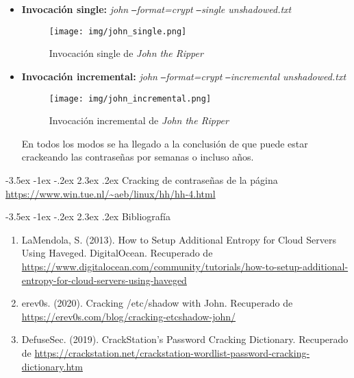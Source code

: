 \documentclass[11pt]{report}
\makeatletter
\renewcommand\chapter{\@startsection{chapter}{0}{\z@}%
    {-3.5ex \@plus -1ex \@minus -.2ex}%
    {2.3ex \@plus.2ex}%
    {\normalfont\Large\bfseries}}
\makeatother
\begin{document}
\begin{itemize}
  \item \textbf{Invocación single:} \emph{john \texttt{--}format=crypt \texttt{--}single unshadowed.txt}
  \begin{figure}[H]
    \centering
    \texttt{[image: img/john\_single.png]}
    \caption{Invocación single de \emph{John the Ripper}}
    \label{fig:invocación single de john the ripper}
  \end{figure}

  \item \textbf{Invocación incremental:} \emph{john \texttt{--}format=crypt \texttt{--}incremental unshadowed.txt}
  \begin{figure}[H]
    \centering
    \texttt{[image: img/john\_incremental.png]}
    \caption{Invocación incremental de \emph{John the Ripper}}
    \label{fig:invocación incremental de john the ripper}
  \end{figure}
  
  En todos los modos se ha llegado a la conclusión de que puede estar crackeando las contraseñas por semanas o incluso años.
\end{itemize}

\cleardoublepage
\chapter{Cracking de contraseñas de la página \url{https://www.win.tue.nl/~aeb/linux/hh/hh-4.html} }


\cleardoublepage

\chapter{Bibliografía} %
\begin{enumerate}
\item LaMendola, S. (2013). How to Setup Additional Entropy for Cloud Servers Using Haveged. DigitalOcean. Recuperado de \url{https://www.digitalocean.com/community/tutorials/how-to-setup-additional-entropy-for-cloud-servers-using-haveged}
\item erev0s. (2020). Cracking /etc/shadow with John. Recuperado de \url{https://erev0s.com/blog/cracking-etcshadow-john/}  
\item DefuseSec. (2019). CrackStation's Password Cracking Dictionary. Recuperado de \url{https://crackstation.net/crackstation-wordlist-password-cracking-dictionary.htm}
\end{enumerate}
\end{document}
